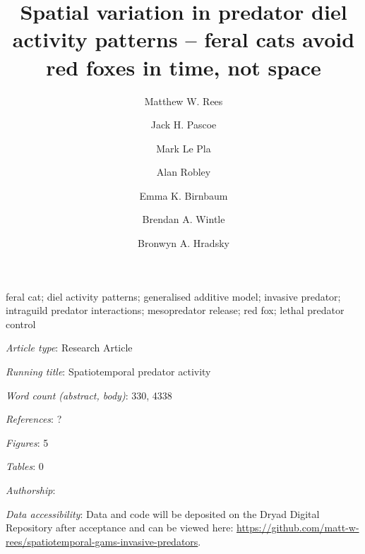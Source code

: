 \documentclass[]{elsarticle} %
\begin{document}
\begin{frontmatter}

  \title{Spatial variation in predator diel activity patterns -- feral cats avoid red foxes in time, not space}
    \author[UOM]{Matthew W. Rees}
    \author[CEC]{Jack H. Pascoe}
  
    \author[CEC]{Mark Le Pla}
  
    \author[ARI]{Alan Robley}
  
    \author[CEC]{Emma K. Birnbaum}
  
    \author[UOM]{Brendan A. Wintle}
  
    \author[UOM]{Bronwyn A. Hradsky}
  
      \address[UOM]{Quantitative \& Applied Ecology Group, School of Ecosystem and Forest Science, The University of Melbourne, Parkville, VIC, Australia}
    \address[CEC]{Conservation Ecology Centre, Otway Lighthouse Rd, Cape Otway, VIC, Australia}
    \address[ARI]{Department of Environment, Land, Water and Planning, Arthur Rylah Institute for Environmental Research, Heidelberg, Australia}
  
  \begin{abstract}
  
  \end{abstract}
   \begin{keyword} feral cat; diel activity patterns; generalised additive model; invasive predator; intraguild predator interactions; mesopredator release; red fox; lethal predator control\end{keyword}
 \end{frontmatter}

\parskip=12pt

\emph{Article type}: Research Article

\emph{Running title}: Spatiotemporal predator activity

\emph{Word count (abstract, body)}: 330, 4338

\emph{References}: ?

\emph{Figures}: 5

\emph{Tables}: 0

\emph{Authorship}:

\emph{Data accessibility}: Data and code will be deposited on the Dryad Digital Repository after acceptance and can be viewed here: \url{https://github.com/matt-w-rees/spatiotemporal-gams-invasive-predators}.

\newpage
\end{document}
